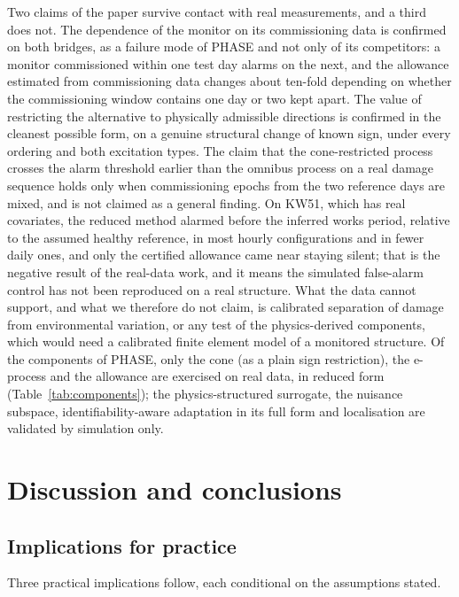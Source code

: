 \documentclass[12pt,a4paper]{article}
\newcommand{\rev}[1]{#1}
\newenvironment{revblock}{}{}
\newcommand{\rev}[1]{{\color{revcol}#1}}
\newenvironment{revblock}{\begingroup\color{revcol}}{\endgroup}
\newcommand{\rtwo}[1]{#1}
\newcommand{\rtwo}[1]{{\color{revcolb}#1}}
\begin{document}
\begin{revblock}
Two claims of the paper survive contact with real measurements, and a third does not. The dependence of the monitor on its commissioning data is confirmed on both bridges, as a failure mode of PHASE and not only of its competitors: a monitor commissioned within one test day alarms on the next, and the allowance estimated from commissioning data changes about ten-fold depending on whether the commissioning window contains one day or two kept apart. The value of restricting the alternative to physically admissible directions is confirmed in the cleanest possible form, on a genuine structural change of known sign, under every ordering and both excitation types. The claim that the cone-restricted process crosses the alarm threshold earlier than the omnibus process on a real damage sequence holds only when commissioning epochs from the two reference days are mixed, and is not claimed as a general finding. \rtwo{On KW51, which has real covariates, the reduced method alarmed before the inferred works period, relative to the assumed healthy reference, in most hourly configurations and in fewer daily ones, and only the certified allowance came near staying silent; that is the negative result of the real-data work, and it means the simulated false-alarm control has not been reproduced on a real structure.} What the data cannot support, and what we therefore do not claim, is calibrated separation of damage from environmental variation, or any test of the physics-derived components, which would need a calibrated finite element model of a monitored structure. Of the components of PHASE, only the cone (as a plain sign restriction), the e-process and the allowance are exercised on real data, in reduced form (Table~\ref{tab:components}); the physics-structured surrogate, the nuisance subspace, identifiability-aware adaptation in its full form and localisation are validated by simulation only.
\end{revblock}

\section{Discussion and conclusions}\label{sec:disc}

\subsection{Implications for practice}\label{sec:practice}

Three practical implications follow, \rev{each conditional on the assumptions stated}.
\end{document}
